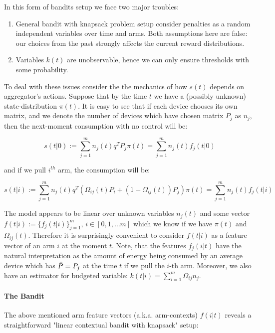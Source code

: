 In this form of bandits setup we face two major troubles: 
\begin{enumerate}
    \item General bandit with knapsack problem setup \cite{Badanidiyuru2013} consider penalties as a random independent variables over time and arms. Both assumptions here are false: our choices from the past strongly affects the current reward distributions.
    \item Variables $k(t)$ are unobservable, hence we can only ensure thresholds with some probability. 
\end{enumerate} 

To deal with these issues consider the the mechanics of how $s(t)$ depends on aggregator's actions. Suppose that by the time $t$ we have a (possibly unknown) state-distribution $\pi(t)$. It is easy to see that if each device chooses its own matrix, and we denote the number of devices which have chosen matrix $P_j$ as $n_j$, then the next-moment consumption with no control will be:

    \begin{equation}
    \label{eq:no_control_consumption}
        s(t|0) := \sum_{j=1}^{m}n_j(t)q^TP_j\pi(t) = \sum_{j=1}^{m}n_j(t)f_j(t|0)
    \end{equation}
    
    and if we pull $i^{th}$ arm, the consumption will be:

    \begin{equation}
        \label{eq:arm_consumption}
        s(t|i) := \sum_{j=1}^mn_j(t)q^T(\Omega_{ij}(t)P_i + (1-\Omega_{ij}(t))P_j)\pi(t) = \sum_{j=1}^{m}n_j(t)f_j(t|i)
    \end{equation}
    
    The model appears to be linear over unknown variables $n_j(t)$ and some vector $f(t|i) := \{f_j(t|i)\}_{j=1}^{m},\, i \in [0, 1, \dots m]$ which we know if we have $\pi(t)$ and $\Omega_{ij}(t)$. Therefore it is surprisingly convenient to consider $f(t|i)$ as a feature vector of an arm $i$ at the moment $t$. Note, that the features $f_j(i|t)$ have the natural interpretation as the amount of energy being consumed by an average device which has ${\bar P} = P_j$ at the time $t$ if we pull the $i$-th arm. Moreover, we also have an estimator for budgeted variable: $k(t|i) = \sum_{i=1}^{m}\Omega_{ij}n_j$.


\paragraph{The Bandit} The above mentioned arm feature vectors (a.k.a. arm-contexts) $f(i|t)$ reveals a straightforward "linear contextual bandit with knapsack" setup:

